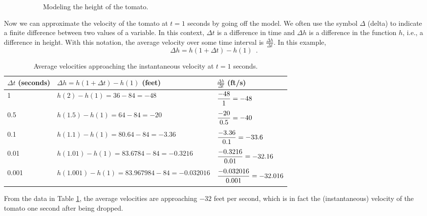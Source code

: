 \begin{example}
\begin{solution}
\begin{figure}[!ht]
\begin{subfigure}[b]{0.4\textwidth}
    \caption{Modeling the height of the tomato.}
    \end{subfigure}
    \caption{ }
    \label{fig:2-2-tomato-model}
\end{figure}

Now we can approximate the velocity of the tomato at $t=1$ seconds by going off the model. We often use the symbol $\Delta$ (delta) to indicate a finite difference between two values of a variable. In this context, $\Delta t$ is a difference in time and $\Delta h$ is a difference in the function $h$, i.e., a difference in height. With this notation, the average velocity over some time interval is $\frac{\Delta h}{\Delta t}$. In this example, 
$$\Delta h = h(1+\Delta t) - h(1) \enspace .$$
\begin{table}[ht!]
\begin{centering}
\begin{tabular}{lll}
\toprule
$\Delta t$ (seconds) & $\Delta h = h(1+\Delta t)-h(1)$ (feet) & $\frac{\Delta h}{\Delta t}$ (ft/s) \\
\midrule
1       & $h(2) - h(1) = 36-84 = -48$                   & $\dfrac{-48\mathstrut}{1\mathstrut} = -48$ \\
0.5     & $h(1.5) - h(1) = 64-84 = -20$                 & $\dfrac{-20\mathstrut}{0.5\mathstrut} = -40$ \\
0.1     & $h(1.1) - h(1) = 80.64-84 = -3.36$            & $\dfrac{-3.36\mathstrut}{0.1\mathstrut} = -33.6$ \\
0.01    & $h(1.01) - h(1) = 83.6784-84 = -0.3216$       & $\dfrac{-0.3216\mathstrut}{0.01\mathstrut} = -32.16$ \\
0.001   & $h(1.001) - h(1) = 83.967984-84 = -0.032016$  & $\dfrac{-0.032016\mathstrut}{0.001\mathstrut} = -32.016$ \\
\bottomrule
\end{tabular}
\caption{Average velocities approaching the instantaneous velocity at $t=1$ seconds.}
\label{tab:2-2-tomato-velocity}
\end{centering}
\end{table}
From the data in Table \ref{tab:2-2-tomato-velocity}, the average velocities are approaching $-32$ feet per second, which is in fact the (instantaneous) velocity of the tomato one second after being dropped.
\end{solution}
\end{example}


